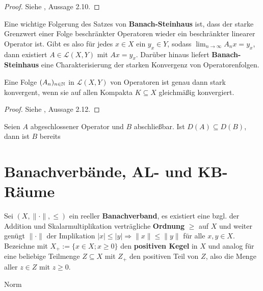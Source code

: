 \begin{proof}
Siehe \cite{banasiak_arlotti_2006}, Aussage 2.10. 
\end{proof}

Eine wichtige Folgerung des Satzes von \textbf{Banach-Steinhaus} ist, dass der starke Grenzwert einer Folge beschränkter Operatoren wieder ein beschränkter linearer Operator ist. Gibt es also für jedes $x\in X$ ein $y_x\in Y$, sodass $\lim_{n\to\infty} A_n x=y_x$, dann existiert $A\in\mathcal L(X,Y)$ mit $Ax= y_x$. Darüber hinaus liefert \textbf{Banach-Steinhaus} eine Charakterisierung der starken Konvergenz von Operatorenfolgen. 

\begin{fsatz}
Eine Folge  $(A_n)_{n\in\mathbb{N}}$ in $\mathcal L(X, Y)$ von Operatoren ist genau dann stark konvergent, wenn sie auf allen Kompakta $K\subseteq X$ gleichmäßig konvergiert.
\end{fsatz}

\begin{proof}
Siehe \cite{banasiak_arlotti_2006}, Aussage 2.12.
\end{proof}

\begin{fsatz}
Seien $A$ abgeschlossener Operator und $B$ abschließbar. Ist $D(A)\subseteq D(B)$, dann ist $B$ bereits 
\end{fsatz}







\section{Banachverbände, AL- und KB-Räume}

\par
Sei  $(X, \|\cdot\|,\leq)$ ein reeller \textbf{Banachverband}, es existiert eine bzgl. der Addition und Skalarmultiplikation verträgliche \textbf{Ordnung} $\geq$ auf $X$ und weiter genügt $\|\cdot\|$ der Implikation $|x|\leq |y|\Rightarrow \|x\|\leq \|y\|$ für alle $x,y\in X$. Bezeichne mit $X_+ := \{x\in X; x\geq0\}$ den \textbf{positiven Kegel} in $X$ und analog für eine beliebige Teilmenge $Z\subseteq X$  mit $Z_+$ den positiven Teil von $Z$, also die Menge aller $z\in Z$ mit $z\geq0$. 

\begin{def}
Norm
\end{def}

